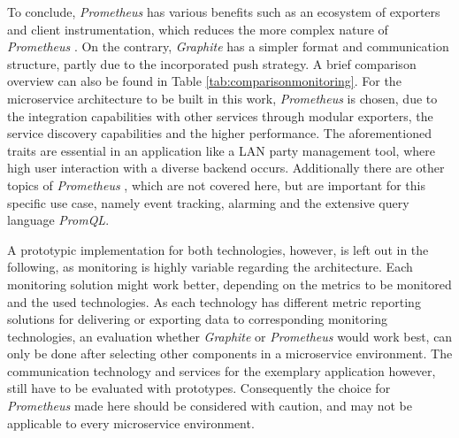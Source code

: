 To conclude, \textit{Prometheus}  has various benefits such as an ecosystem of exporters and client instrumentation, which reduces the more complex nature of \textit{Prometheus} .
On the contrary, \textit{Graphite}  has a simpler format and communication structure, partly due to the incorporated push strategy.
A brief comparison overview can also be found in Table \ref{tab:comparisonmonitoring}.
For the microservice architecture to be built in this work, \textit{Prometheus}  is chosen, due to the integration capabilities with other services through modular exporters, the service discovery capabilities and the higher performance.
The aforementioned traits are essential in an application like a \ac{LAN} party management tool, where high user interaction with a diverse backend occurs.
Additionally there are other topics of \textit{Prometheus} , which are not covered here, but are important for this specific use case, namely event tracking, alarming and the extensive query language \textit{PromQL}.

A prototypic implementation for both technologies, however, is left out in the following, as monitoring is highly variable regarding the architecture.
Each monitoring solution might work better, depending on the metrics to be monitored and the used technologies.
As each technology has different metric reporting solutions for delivering or exporting data to corresponding monitoring technologies, an evaluation whether \textit{Graphite}  or \textit{Prometheus}  would work best, can only be done after selecting other components in a microservice environment.
The communication technology and services for the exemplary application however, still have to be evaluated with prototypes.
Consequently the choice for \textit{Prometheus}  made here should be considered with caution, and may not be applicable to every microservice environment.
